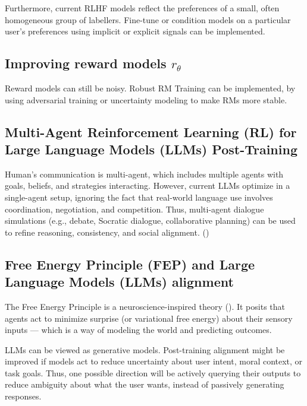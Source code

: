 \documentclass{article} %
\begin{document}
Furthermore, current RLHF models reflect the preferences of a small, often homogeneous group of labellers. Fine-tune or condition models on a particular user’s preferences using implicit or explicit signals can be implemented. 

\subsection{Improving reward models \(r_\theta\)}
Reward models can still be noisy. Robust RM Training can be implemented, by using adversarial training or uncertainty modeling to make RMs more stable.

\subsection{Multi-Agent Reinforcement Learning (RL) for Large Language Models (LLMs) Post-Training}
Human's communication is multi-agent, which includes multiple agents with goals, beliefs, and strategies interacting. However, current LLMs optimize in a single-agent setup, ignoring the fact that real-world language use involves coordination, negotiation, and competition. Thus, multi-agent dialogue simulations (e.g., debate, Socratic dialogue, collaborative planning) can be used to refine reasoning, consistency, and social alignment. (\cite{lowe2017marl})



\subsection{Free Energy Principle (FEP) and Large Language Models (LLMs) alignment}
The Free Energy Principle is a neuroscience-inspired theory (\cite{friston2010fep}). It posits that agents act to minimize surprise (or variational free energy) about their sensory inputs — which is a way of modeling the world and predicting outcomes. 

LLMs can be viewed as generative models. Post-training alignment might be improved if models act to reduce uncertainty about user intent, moral context, or task goals. Thus, one possible direction will be actively querying their outputs to reduce ambiguity about what the user wants, instead of passively generating responses.





\end{document}

